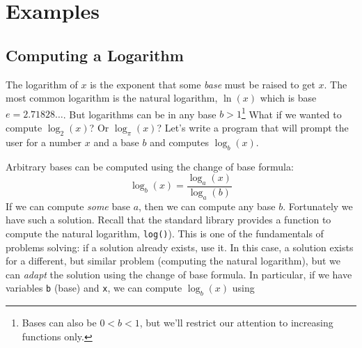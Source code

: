 %
%
%
%

\section{Examples}

\subsection{Computing a Logarithm}

The logarithm of $x$ is the exponent that some \emph{base} must 
be raised to get $x$.  The most common logarithm is the natural logarithm, 
$\ln{(x)}$ which is base $e = 2.71828\ldots$.  But logarithms can be in any base 
$b > 1$\footnote{Bases can also be $0< b < 1$, but we'll restrict our attention to
increasing functions only.}  What if we wanted to compute $\log_2{(x)}$?  
Or $\log_{\pi}{(x)}$?  Let's write a program that will prompt the user for a
number $x$ and a base $b$ and computes $\log_b{(x)}$.

Arbitrary bases can be computed using the change of base formula: 
  $$\log_b(x) = \frac{\log_a{(x)}}{\log_a{(b)}}$$
If we can compute \emph{some} base $a$, then we can compute any base 
$b$.  Fortunately we have such a solution.  Recall that the standard library 
provides a function to compute the natural logarithm, \texttt{log()}).
This is one of the fundamentals of problems solving: if a solution already 
exists, use it.  In this case, a solution exists for a different, but similar problem
(computing the natural logarithm), but we can \emph{adapt} the solution 
using the change of base formula.  In particular, if we have variables 
\texttt{b} (base) and \texttt{x}, we can compute $\log_b{(x)}$ using

